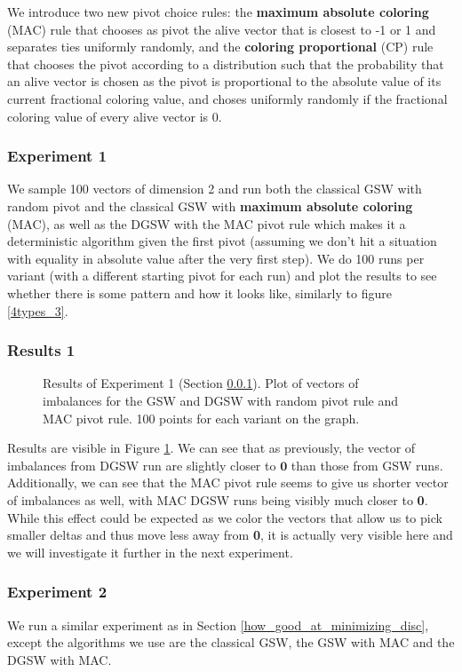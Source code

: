 \documentclass[12pt]{article}
\begin{document}
We introduce two new pivot choice rules: the \textbf{maximum absolute coloring} (MAC) rule that chooses as pivot the alive vector that is closest to -1 or 1 and separates ties uniformly randomly, and the \textbf{coloring proportional} (CP) rule that chooses the pivot according to a distribution such that the probability that an alive vector is chosen as the pivot is proportional to the absolute value of its current fractional coloring value, and choses uniformly randomly if the fractional coloring value of every alive vector is 0.

\subsubsection{Experiment 1}\label{exp_plot_max_col}
We sample 100 vectors of dimension 2 and run both the classical GSW with random pivot and the classical GSW with \textbf{maximum absolute coloring} (MAC), as well as the DGSW with the MAC pivot rule which makes it a deterministic algorithm given the first pivot (assuming we don't hit a situation with equality in absolute value after the very first step). We do 100 runs per variant (with a different starting pivot for each run) and plot the results to see whether there is some pattern and how it looks like, similarly to figure \ref{4types_3}.

\subsubsection{Results 1}
\begin{figure}[h!]
\centering

\caption{Results of Experiment 1 (Section \ref{exp_plot_max_col}). Plot of vectors of imbalances for the GSW and DGSW with random pivot rule and MAC pivot rule. 100 points for each variant on the graph.}
\label{results_plot_max_col}
\end{figure}
Results are visible in Figure \ref{results_plot_max_col}. We can see that as previously, the vector of imbalances from DGSW run are slightly closer to $\textbf{0}$ than those from GSW runs. Additionally, we can see that the MAC pivot rule seems to give us shorter vector of imbalances as well, with MAC DGSW runs being visibly much closer to \textbf{0}. While this effect could be expected as we color the vectors that allow us to pick smaller deltas and thus move less away from \textbf{0}, it is actually very visible here and we will investigate it further in the next experiment.

\subsubsection{Experiment 2}\label{exp_norms_max_col}
We run a similar experiment as in Section \ref{how_good_at_minimizing_disc}, except the algorithms we use are the classical GSW, the GSW with MAC and the DGSW with MAC.
\end{document}
